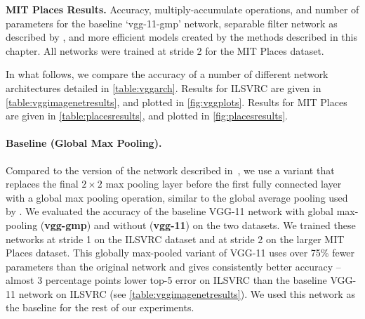\documentclass[thesis]{subfiles}
\begin{document}
    \begin{table}[tbp]
       	\centering
       	\caption[Low-rank MIT Places results]{{\bf MIT Places Results.} Accuracy, multiply-accumulate operations, and number of parameters for the baseline `vgg-11-gmp' network, separable filter network as described by \citet{journals/corr/JaderbergVZ14}, and more efficient models created by the methods described in this chapter. All networks were trained at stride 2 for the MIT Places dataset.
       	}
       	\data
       	\pgfplotstabletypeset[
       	every head row/.style={
       		before row=\toprule,after row=\midrule},
       	every last row/.style={
       		after row=\bottomrule},
       	fixed zerofill,     %
       	columns={Network, Stride, Multiply-Acc., Param., Top-1 Acc., Top-5 Acc.},
       	column type/.add={lrrrrrr}{},
       	columns/Multiply-Acc./.style={
       		column name=Multiple-Acc. {\small $\times 10^{8}$},
       		preproc/expr={{##1/1e8}}
       	},
       	columns/Param./.style={
       		column name=Param. {\small $\times 10^{7}$},
       		preproc/expr={{##1/1e7}}
       	},
       	columns/Network/.style={string type},
       	columns/Stride/.style={precision=0},
       	columns/Top-1 Acc./.style={precision=3},
       	columns/Top-5 Acc./.style={precision=3},
       	highlight col max ={\data}{Top-1 Acc.},
       	highlight col max ={\data}{Top-5 Acc.}, 
       	highlight col min ={\data}{Param.}, 
       	highlight col min ={\data}{Multiply-Acc.}, 
       	col sep=comma]{\data}
       	\label{table:placesresults}
    \end{table}
    
    
    In what follows, we compare the accuracy of a number of different network architectures detailed in  \cref{table:vggarch}. Results for ILSVRC are given in \cref{table:vggimagenetresults}, and plotted in \cref{fig:vggplots}. Results for MIT Places are given in \cref{table:placesresults}, and plotted in \cref{fig:placesresults}. 
    
    \paragraph{Baseline (Global Max Pooling).}  Compared to the version of the network described in~\citep{Simonyan2014verydeep}, we use a variant that replaces the final $2 \times 2$ max pooling layer before the first fully connected layer with a global max pooling operation, similar to the global average pooling used by \citet{Lin2014,Szegedy2014going}. We evaluated the accuracy of the baseline VGG-11 network with global max-pooling (\textbf{vgg-gmp}) and without (\textbf{vgg-11}) on the two datasets. We trained these networks at stride 1 on the ILSVRC dataset and at stride 2 on the larger MIT Places dataset. This globally max-pooled variant of VGG-11 uses over 75\% fewer parameters than the original network and gives consistently better accuracy -- almost 3 percentage points lower top-5 error on ILSVRC than the baseline VGG-11 network on ILSVRC (see \cref{table:vggimagenetresults}). We used this network as the baseline for the rest of our experiments.
    
\end{document}
